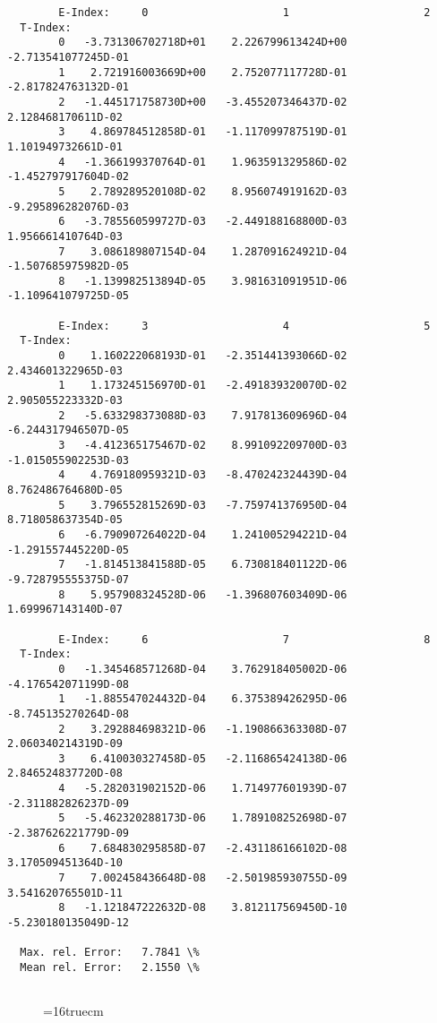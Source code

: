 \documentclass[12pt,dvipdfmx]{article}
\begin{document}
\begin{small}\begin{verbatim}
        E-Index:     0                     1                     2
  T-Index:
        0   -3.731306702718D+01    2.226799613424D+00   -2.713541077245D-01
        1    2.721916003669D+00    2.752077117728D-01   -2.817824763132D-01
        2   -1.445171758730D+00   -3.455207346437D-02    2.128468170611D-02
        3    4.869784512858D-01   -1.117099787519D-01    1.101949732661D-01
        4   -1.366199370764D-01    1.963591329586D-02   -1.452797917604D-02
        5    2.789289520108D-02    8.956074919162D-03   -9.295896282076D-03
        6   -3.785560599727D-03   -2.449188168800D-03    1.956661410764D-03
        7    3.086189807154D-04    1.287091624921D-04   -1.507685975982D-05
        8   -1.139982513894D-05    3.981631091951D-06   -1.109641079725D-05

        E-Index:     3                     4                     5
  T-Index:
        0    1.160222068193D-01   -2.351441393066D-02    2.434601322965D-03
        1    1.173245156970D-01   -2.491839320070D-02    2.905055223332D-03
        2   -5.633298373088D-03    7.917813609696D-04   -6.244317946507D-05
        3   -4.412365175467D-02    8.991092209700D-03   -1.015055902253D-03
        4    4.769180959321D-03   -8.470242324439D-04    8.762486764680D-05
        5    3.796552815269D-03   -7.759741376950D-04    8.718058637354D-05
        6   -6.790907264022D-04    1.241005294221D-04   -1.291557445220D-05
        7   -1.814513841588D-05    6.730818401122D-06   -9.728795555375D-07
        8    5.957908324528D-06   -1.396807603409D-06    1.699967143140D-07

        E-Index:     6                     7                     8
  T-Index:
        0   -1.345468571268D-04    3.762918405002D-06   -4.176542071199D-08
        1   -1.885547024432D-04    6.375389426295D-06   -8.745135270264D-08
        2    3.292884698321D-06   -1.190866363308D-07    2.060340214319D-09
        3    6.410030327458D-05   -2.116865424138D-06    2.846524837720D-08
        4   -5.282031902152D-06    1.714977601939D-07   -2.311882826237D-09
        5   -5.462320288173D-06    1.789108252698D-07   -2.387626221779D-09
        6    7.684830295858D-07   -2.431186166102D-08    3.170509451364D-10
        7    7.002458436648D-08   -2.501985930755D-09    3.541620765501D-11
        8   -1.121847222632D-08    3.812117569450D-10   -5.230180135049D-12

  Max. rel. Error:   7.7841 \%
  Mean rel. Error:   2.1550 \%


\end{verbatim}\end{small}
\begin{figure} \label{2.2.15e}
\epsfxsize=16truecm
\end{figure}
\newpage
\end{document}
